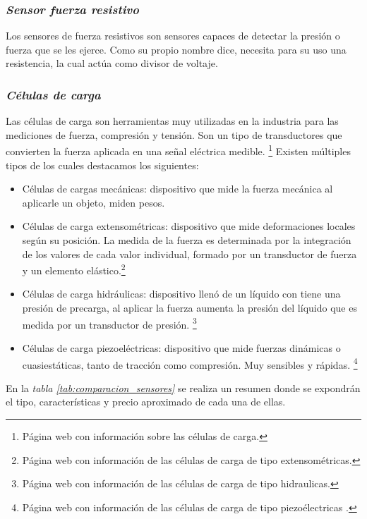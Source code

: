 \subsubsection{\textit{{Sensor fuerza resistivo}}}
Los sensores de fuerza resistivos son sensores capaces de detectar la presión o fuerza que se les ejerce.
Como su propio nombre dice, necesita para su uso una resistencia, la cual actúa como divisor de voltaje.
\subsubsection{\textit{{Células de carga}}}
Las células de carga son herramientas muy utilizadas en la industria para las mediciones de fuerza, compresión y tensión.
Son un tipo de transductores que convierten la fuerza aplicada  en una señal eléctrica medible. \cite{Celula_Carga}\footnote{Página web con información sobre las células de carga\cite{Celula_Carga}.}
Existen múltiples tipos de los cuales destacamos los siguientes:
    \begin{itemize}
        \item Células de cargas mecánicas: dispositivo que mide la fuerza mecánica al aplicarle un objeto, miden pesos.
        \item Células de carga extensométricas: dispositivo que mide deformaciones locales según su posición. La medida de la fuerza es determinada por la integración de los valores de cada valor individual, formado por un transductor de fuerza y un elemento elástico.\cite{celulas_extensométricas}\footnote{Página web con información de las células de carga de tipo extensométricas\cite{celulas_extensométricas}.}
        \item Células de carga hidráulicas: dispositivo llenó de un líquido con tiene una presión de precarga, al aplicar la fuerza aumenta la presión del líquido que es medida por un transductor de presión.
        \cite{Celulas_hidraulicas}\footnote{Página web con información de las células de carga de tipo hidraulicas\cite{Celulas_hidraulicas}.}
        \item Células de carga piezoeléctricas: dispositivo que mide fuerzas dinámicas o cuasiestáticas, tanto de tracción como compresión. Muy sensibles y rápidas.
        \cite{Celulas_piezoelectricas}\footnote{Página web con información de las células de carga de tipo piezoélectricas \cite{Celulas_piezoelectricas}.}
    \end{itemize}
En la \textit{tabla \ref{tab:comparacion_sensores}} se realiza un resumen donde se expondrán el tipo, características y precio aproximado de cada una de ellas.
